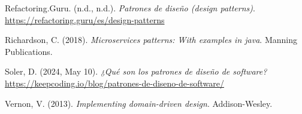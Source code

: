 \documentclass[
  11pt,
  letterpaper,
]{article}
\newlength{\cslhangindent}
\newenvironment{CSLReferences}[2] %
 {\begin{list}{}{%
  \setlength{\itemindent}{0pt}
  \setlength{\leftmargin}{0pt}
  \setlength{\parsep}{0pt}
  \ifodd #1
   \setlength{\leftmargin}{\cslhangindent}
   \setlength{\itemindent}{-1\cslhangindent}
  \fi
  \setlength{\itemsep}{#2\baselineskip}}}
 {\end{list}}
\begin{document}
\begin{CSLReferences}{1}{0}
Refactoring.Guru. (n.d., n.d.). \emph{Patrones de diseño (design
patterns)}. \url{https://refactoring.guru/es/design-patterns}

Richardson, C. (2018). \emph{Microservices patterns: With examples in
java}. Manning Publications.

Soler, D. (2024, May 10). \emph{¿Qué son los patrones de diseño de
software?}
\url{https://keepcoding.io/blog/patrones-de-diseno-de-software/}

Vernon, V. (2013). \emph{Implementing domain-driven design}.
Addison-Wesley.

\end{CSLReferences}
\end{document}
